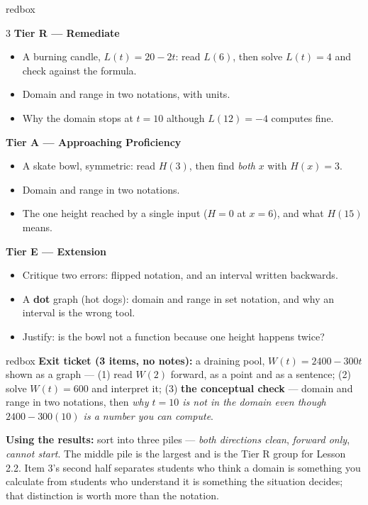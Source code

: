 \documentclass[10pt]{article}
\begin{document}
\boxguard
\begin{skillbox}{redbox}
\begin{multicols}{3}
\textbf{Tier R --- Remediate}
\begin{itemize}[leftmargin=1em, itemsep=1pt, topsep=2pt]
  \item A burning candle, $L(t)=20-2t$: read $L(6)$, then solve $L(t)=4$ and check against the
        formula.
  \item Domain and range in two notations, with units.
  \item Why the domain stops at $t=10$ although $L(12)=-4$ computes fine.
\end{itemize}

\columnbreak
\textbf{Tier A --- Approaching Proficiency}
\begin{itemize}[leftmargin=1em, itemsep=1pt, topsep=2pt]
  \item A skate bowl, symmetric: read $H(3)$, then find \emph{both} $x$ with $H(x)=3$.
  \item Domain and range in two notations.
  \item The one height reached by a single input ($H=0$ at $x=6$), and what $H(15)$ means.
\end{itemize}

\columnbreak
\textbf{Tier E --- Extension}
\begin{itemize}[leftmargin=1em, itemsep=1pt, topsep=2pt]
  \item Critique two errors: flipped notation, and an interval written backwards.
  \item A \textbf{dot} graph (hot dogs): domain and range in set notation, and why an interval is
        the wrong tool.
  \item Justify: is the bowl not a function because one height happens twice?
\end{itemize}
\end{multicols}
\end{skillbox}

\begin{skillbox}{redbox}
\textbf{Exit ticket (3 items, no notes):} a draining pool, $W(t)=2400-300t$ shown as a graph ---
(1) read $W(2)$ forward, as a point and as a sentence; (2) solve $W(t)=600$ and interpret it;
(3) \textbf{the conceptual check} --- domain and range in two notations, then \emph{why $t=10$ is
not in the domain even though $2400-300(10)$ is a number you can compute}.

\textbf{Using the results:} sort into three piles --- \emph{both directions clean},
\emph{forward only}, \emph{cannot start}. The middle pile is the largest and is the Tier R group
for Lesson 2.2. Item 3's second half separates students who think a domain is something you
calculate from students who understand it is something the situation decides; that distinction is
worth more than the notation.
\end{skillbox}
\end{document}
